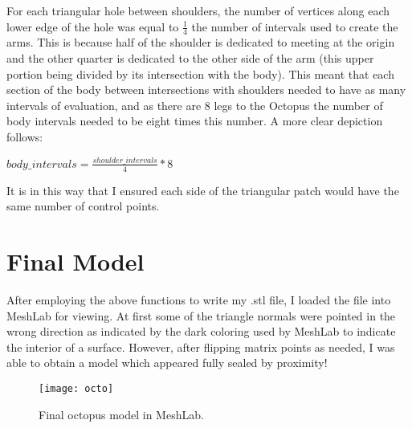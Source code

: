 \documentclass[twocolumn]{article}
\begin{document}
For each triangular hole between shoulders, the number of vertices along each lower edge of the hole was equal to $\frac{1}{4}$ the number of intervals used to create the arms. This is because half of the shoulder is dedicated to meeting at the origin and the other quarter is dedicated to the other side of the arm (this upper portion being divided by its intersection with the body). This meant that each section of the body between intersections with shoulders needed to have as many intervals of evaluation, and as there are 8 legs to the Octopus the number of body intervals needed to be eight times this number. A more clear depiction follows:

\begin{center}
$body\_intervals = \frac{shoulder\_intervals}{4} * 8 $ 
\end{center}


It is in this way that I ensured each side of the triangular patch would have the same number of control points.

\section{Final Model}

After employing the above functions to write my .stl file, I loaded the file into MeshLab for viewing. At first some of the triangle normals were pointed in the wrong direction as indicated by the dark coloring used by MeshLab to indicate the interior of a surface. However, after flipping matrix points as needed, I was able to obtain a model which appeared fully sealed by proximity!

\begin{figure}[h!]
\begin{center}
\texttt{[image: octo]}
\caption{Final octopus model in MeshLab.}
\end{center}
\end{figure}
\end{document}
